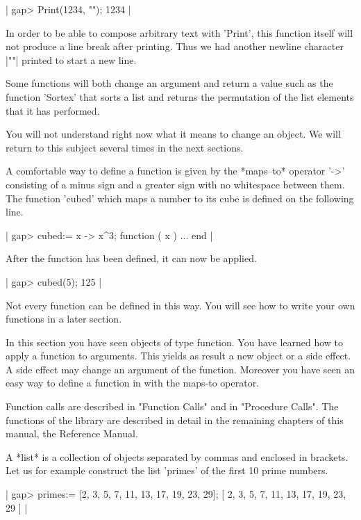 |    gap> Print(1234, "\n");
    1234 |

In order to be able to compose arbitrary text with 'Print', this function
itself will not produce a line break after printing.  Thus we had another
newline character |"\n"| printed to start a new line.

Some functions will both change an argument and return a  value  such  as
the function  'Sortex' that sorts a  list  and returns the permutation of
the list elements that it has performed.

You will not  understand right now what it means to change an object.  We
will return to this subject several times in the next sections.

A comfortable  way  to  define  a  function  is  given by  the *maps--to*
operator '->'  consisting  of a minus  sign and  a greater  sign  with no
whitespace between them.  The function 'cubed' which maps a number to its
cube is defined on the following line.

|    gap> cubed:= x -> x^3;
    function ( x ) ... end |

After the function has been defined, it can now be applied.

|    gap> cubed(5);
    125 |

Not every {\GAP} function can be defined in this  way.   You will see how
to write your own {\GAP} functions in a later section.

In this section you have seen {\GAP} objects of  type function.  You have
learned how to apply a function to  arguments.  This  yields as result  a
new object or a side effect.  A side effect may change an argument of the
function.   Moreover you have seen an easy  way  to define a  function in
{\GAP} with the maps-to operator.

Function  calls are described   in   "Function  Calls" and in  "Procedure
Calls".  The functions  of the {\GAP} library are  described in detail in
the remaining chapters of this manual, the Reference Manual.


A *list* is a collection of objects separated by  commas and enclosed  in
brackets.  Let us for example construct the list 'primes' of the first 10
prime numbers.

|    gap> primes:= [2, 3, 5, 7, 11, 13, 17, 19, 23, 29];
    [ 2, 3, 5, 7, 11, 13, 17, 19, 23, 29 ] |

